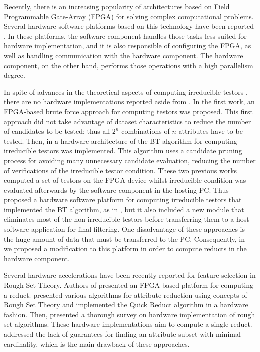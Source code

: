 \documentclass[authoryear,preprint,review,12pt]{elsarticle}
\begin{document}
Recently, there is an increasing popularity of architectures based on Field Programmable Gate-Array (FPGA) for solving complex computational problems. Several hardware software platforms based on this technology have been reported \citep{R29,R30}. In these platforms, the software component handles those tasks less suited for hardware implementation, and it is also responsible of configuring the FPGA, as well as handling communication with the hardware component. The hardware component, on the other hand, performs those operations with a high parallelism degree.

In spite of advances in the theoretical aspects of computing irreducible testors \citep{R5,R8,R9}, there are no hardware implementations reported aside from \citep{R10,R11,R21}. In the first work, an FPGA-based brute force approach for computing testors was proposed\citep{R10}. This first approach did not take advantage of dataset characteristics to reduce the number of candidates to be tested; thus all $2^n$ combinations of $n$ attributes have to be tested. Then, in \citep{R11} a hardware architecture of the BT algorithm \citep{R31} for computing irreducible testors was implemented. This algorithm uses a candidate pruning process for avoiding many unnecessary candidate evaluation, reducing the number of verifications of the irreducible testor condition. These two previous works computed a set of testors on the FPGA device whilst irreducible condition was evaluated afterwards by the software component in the hosting PC. Thus \cite{R21} proposed a hardware software platform for computing irreducible testors that implemented the BT algorithm, as in \citep{R11}, but it also included a new module that eliminates most of the non irreducible testors before transferring them to a host software application for final filtering. One disadvantage of these approaches is the huge amount of data that must be transferred to the PC. Consequently, in~\citep{Rod14} we proposed a modification to this platform in order to compute reducts in the hardware component. 

Several hardware accelerations have been recently reported for feature selection in Rough Set Theory.  Authors of \citep{Grze13,Kop14} presented an FPGA based platform for computing a reduct. \cite{Tiwari13} presented various algorithms for attribute reduction using concepts of Rough Set Theory and implemented the Quick Reduct algorithm in a hardware fashion. Then, \cite{Tiwari14} presented a thorough survey on hardware implementation of rough set algorithms. These hardware implementations aim to compute a single reduct. \cite{Jensen14} addressed the lack of guarantees for finding an attribute subset with minimal cardinality, which is the main drawback of these approaches. 
\end{document}
